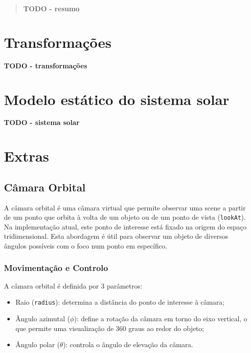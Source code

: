 \documentclass[12pt, a4paper]{article}
\begin{document}
\pagebreak

\begin{abstract}
    \textbf{\color{red} TODO - resumo}
\end{abstract}

\section{Transformações}

\textbf{\color{red} TODO - transformações}

\section{Modelo estático do sistema solar}

\textbf{\color{red} TODO - sistema solar}

\section{Extras}

\subsection{Câmara Orbital}

A câmara orbital é uma câmara virtual que permite observar uma scene a partir de um ponto que
orbita à volta de um objeto ou de um ponto de vista (\texttt{lookAt}). Na implementação atual, este
ponto de interesse está fixado na origem do espaço tridimensional. Esta abordagem é útil para
observar um objeto de diversos ângulos possíveis com o foco num ponto em específico.

\subsubsection{Movimentação e Controlo}

A câmara orbital é definida por 3 parâmetros:
\begin{itemize}
    \item Raio (\texttt{radius}): determina a distância do ponto de interesse à câmara;
    \item Ângulo azimutal ($\phi$): define a rotação da câmara em torno do eixo vertical,
    o que permite uma visualização de 360 graus ao redor do objeto;
    \item Ângulo polar ($\theta$): controla o ângulo de elevação da câmara.
\end{itemize}
\end{document}
